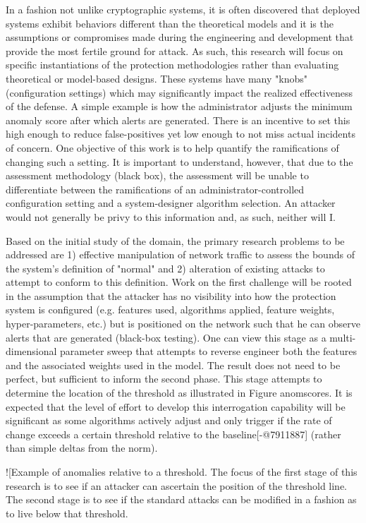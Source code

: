 In a fashion not unlike cryptographic systems, it is often discovered that deployed systems exhibit behaviors different than the theoretical models and it is the assumptions or compromises made during the engineering and development that provide the most fertile ground for attack. As such, this research will focus on specific instantiations of the protection methodologies rather than evaluating theoretical or model-based designs. These systems have many "knobs" (configuration settings) which may significantly impact the realized effectiveness of the defense. A simple example is how the administrator adjusts the minimum anomaly score after which alerts are generated. There is an incentive to set this high enough to reduce false-positives yet low enough to not miss actual incidents of concern. One objective of this work is to help quantify the ramifications of changing such a setting. It is important to understand, however, that due to the assessment methodology (black box), the assessment will be unable to differentiate between the ramifications of an administrator-controlled configuration setting and a system-designer algorithm selection. An attacker would not generally be privy to this information and, as such, neither will I.

Based on the initial study of the domain, the primary research problems to be addressed are 1) effective manipulation of network traffic to assess the bounds of the system's definition of "normal" and 2) alteration of existing attacks to attempt to conform to this definition. Work on the first challenge will be rooted in the assumption that the attacker has no visibility into how the protection system is configured (e.g. features used, algorithms applied, feature weights, hyper-parameters, etc.) but is positioned on the network such that he can observe alerts that are generated (black-box testing). One can view this stage as a multi-dimensional parameter sweep that attempts to reverse engineer both the features and the associated weights used in the model. The result does not need to be perfect, but sufficient to inform the second phase. This stage attempts to determine the location of the threshold as illustrated in Figure anomscores. It is expected that the level of effort to develop this interrogation capability will be significant as some algorithms actively adjust and only trigger if the rate of change exceeds a certain threshold relative to the baseline[-@7911887] (rather than simple deltas from the norm).

![Example of anomalies relative to a threshold. The focus of the first stage of this research is to see if an attacker can ascertain the position of the threshold line. The second stage is to see if the standard attacks can be modified in a fashion as to live below that threshold. 

